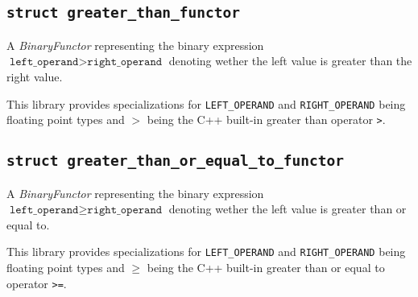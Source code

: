 \documentclass[oneside]{book}
\begin{document}
\subsection{\texttt{struct greater\_than\_functor}}
A \textit{BinaryFunctor} representing the binary expression
$\texttt{left\_operand} > \texttt{right\_operand}$
denoting wether the left value is greater than the right value.\newline

\noindent{}This library provides specializations for \texttt{LEFT\_OPERAND} and \texttt{RIGHT\_OPERAND} being floating point types
and $>$ being the C++ built-in greater than operator \texttt{>}.

\subsection{\texttt{struct greater\_than\_or\_equal\_to\_functor}}
A \textit{BinaryFunctor} representing the binary expression
$\texttt{left\_operand} \geq \texttt{right\_operand}$
denoting wether the left value is greater than or equal to.\newline

\noindent{}This library provides specializations for \texttt{LEFT\_OPERAND} and \texttt{RIGHT\_OPERAND} being floating point types
and $\geq$ being the C++ built-in greater than or equal to operator \texttt{>=}.
\end{document}
